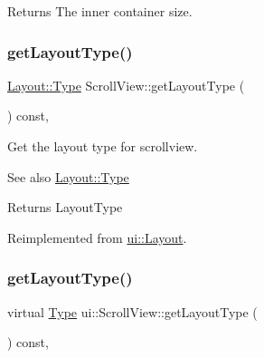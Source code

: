 \begin{DoxyReturn}{Returns}
The inner container size. 
\end{DoxyReturn}
\mbox{\label{classui_1_1ScrollView_a437befb0a341d9f9c2278e3f119a1af7}} 
\subsubsection{\texorpdfstring{get\+Layout\+Type()}{getLayoutType()}\hspace{0.1cm}{\footnotesize\ttfamily [1/2]}}
{\footnotesize\ttfamily \hyperlink{classui_1_1Layout_aecabbc1592677eadd6757edc1df5b952}{Layout\+::\+Type} Scroll\+View\+::get\+Layout\+Type (\begin{DoxyParamCaption}{ }\end{DoxyParamCaption}) const\hspace{0.3cm}{\ttfamily [override]}, {\ttfamily [virtual]}}

Get the layout type for scrollview.

\begin{DoxySeeAlso}{See also}
{\ttfamily \hyperlink{classui_1_1Layout_aecabbc1592677eadd6757edc1df5b952}{Layout\+::\+Type}} 
\end{DoxySeeAlso}
\begin{DoxyReturn}{Returns}
Layout\+Type 
\end{DoxyReturn}


Reimplemented from \hyperlink{classui_1_1Layout_a4eaf95d303163cfd1064575625c95b33}{ui\+::\+Layout}.

\mbox{\label{classui_1_1ScrollView_a580fc58c93a299b55fc3c25ab96d22cf}} 
\subsubsection{\texorpdfstring{get\+Layout\+Type()}{getLayoutType()}\hspace{0.1cm}{\footnotesize\ttfamily [2/2]}}
{\footnotesize\ttfamily virtual \hyperlink{classui_1_1Layout_aecabbc1592677eadd6757edc1df5b952}{Type} ui\+::\+Scroll\+View\+::get\+Layout\+Type (\begin{DoxyParamCaption}{ }\end{DoxyParamCaption}) const\hspace{0.3cm}{\ttfamily [override]}, {\ttfamily [virtual]}}

